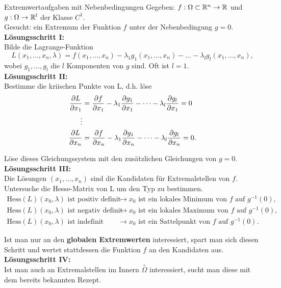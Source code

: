 \begin{Rezept}{Extremwertaufgaben mit Nebenbedingungen}{}
	Gegeben: $f:\Omega\subset \mathbb{R}^n \to \mathbb{R}$ und $g:\Omega \to \mathbb{R}^l$ der Klasse $C^1$.\\
	Gesucht: ein Extremum der Funktion $f$ unter der Nebenbedingung $g=0$.\\
	\newline
	\textbf{Lösungsschritt I:}\\
	Bilde die Lagrange-Funktion
	\begin{equation*}
	L(x_1,\dots,x_n,\lambda) = f(x_1,\dots,x_n) - \lambda_1 g_1(x_1,\dots,x_n) - \dots - \lambda_l g_l(x_1,\dots,x_n),
	\end{equation*}
	wobei $g_1,\dots,g_l$ die $l$ Komponenten von $g$ sind. Oft ist $l=1$.\\
	\newline
	\textbf{Lösungsschritt II:}\\
	Bestimme die kriischen Punkte von L, d.h. löse
	\begin{align*}
	\pdv{L}{x_1} &= \pdv{f}{x_1}-\lambda_1\pdv{g_1}{x_1} - \dots -\lambda_l\pdv{g_l}{x_1} = 0\\
	\vdots\\
	\pdv{L}{x_n} &= \pdv{f}{x_n}-\lambda_1\pdv{g_1}{x_n} - \dots -\lambda_l\pdv{g_l}{x_n} = 0.
	\end{align*}
	
	Löse dieses Gleichungssystem mit den zusätzlichen Gleichungen von $g=0$.\\
	\newline
	\textbf{Lösungsschritt III:}\\
	Die Lösungen $(x_1,\dots,x_n)$ sind die Kandidaten für Extremalstellen von $f$. Untersuche die Hesse-Matrix von L um den Typ zu bestimmen.
	\begin{align*}
	\text{Hess}(L)(x_0,\lambda)\text{ ist positiv definit} &\rightarrow 
	x_0 \text{ ist ein lokales Minimum von } f \text{ auf } g^{-1}(0),\\
	\text{Hess}(L)(x_0,\lambda)\text{ ist negativ definit} &\rightarrow x_0 \text{ ist ein lokales Maximum von } f \text{ auf } g^{-1}(0),\\
	\text{Hess}(L)(x_0,\lambda)\text{ ist indefinit} &\rightarrow x_0 \text{ ist ein Sattelpunkt von } f \text{ auf } g^{-1}(0).
	\end{align*}
	
	Ist man nur an den \textbf{globalen Extremwerten} interessiert, spart man sich diesen Schritt und wertet stattdessen die Funktion $f$ an den Kandidaten aus.\\
	\newline
	\textbf{Lösungsschritt IV:}\\
	Ist man auch an Extremalstellen im Innern $\overset{\circ}{\Omega}$ interessiert, sucht man diese mit dem bereits bekannten Rezept.
\end{Rezept}